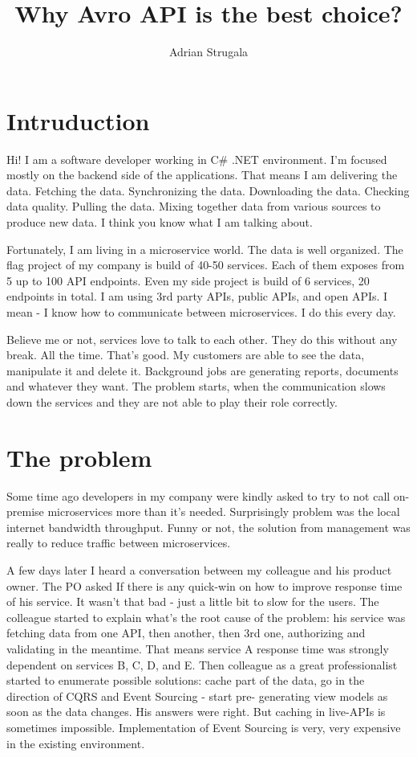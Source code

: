 \documentclass[]{article}
\title{Why Avro API is the best choice?}
\author{Adrian Strugala}
\begin{document}
\maketitle

\section{Intruduction}

Hi! I am a software developer working in C\# .NET environment. I'm focused mostly on the backend side of the applications. That means I am delivering the data. Fetching the data. Synchronizing the data. Downloading the data. Checking data quality. Pulling the data. Mixing together data from various sources to produce new data. I think you know what I am talking about.

Fortunately, I am living in a microservice world. The data is well organized. The flag project of my company is build of 40-50 services. Each of them exposes from 5 up to 100 API endpoints. Even my side project is build of 6 services, 20 endpoints in total. I am using 3rd party APIs, public APIs, and open APIs. I mean - I know how to communicate between microservices. I do this every day.

Believe me or not, services love to talk to each other. They do this without any break. All the time. That's good. My customers are able to see the data, manipulate it and delete it. Background jobs are generating reports, documents and whatever they want. The problem starts, when the communication slows down the services and they are not able to play their role correctly.


\section{The problem}

Some time ago developers in my company were kindly asked to try to not call on-premise microservices more than it's needed. Surprisingly problem was the local internet bandwidth throughput. Funny or not, the solution from management was really to reduce traffic between microservices.

A few days later I heard a conversation between my colleague and his product owner. The PO asked If there is any quick-win on how to improve response time of his service. It wasn't that bad - just a little bit to slow for the users. The colleague started to explain what's the root cause of the problem: his service was fetching data from one API, then another, then 3rd one, authorizing and validating in the meantime. That means service A response time was strongly dependent on services B, C, D, and E. Then colleague as a great professionalist started to enumerate possible solutions: cache part of the data, go in the direction of CQRS and Event Sourcing - start pre- generating view models as soon as the data changes. His answers were right. But caching in live-APIs is sometimes impossible. Implementation of Event Sourcing is very, very expensive in the existing environment.
\end{document}
